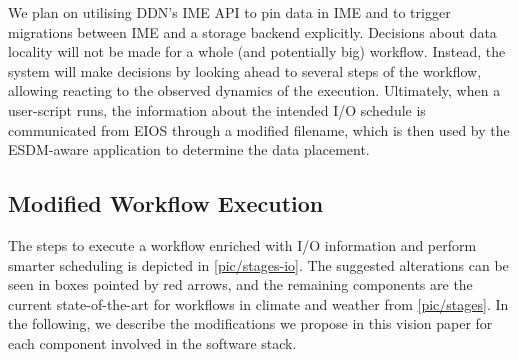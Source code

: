 \documentclass{superfri}
\begin{document}
We plan on utilising DDN's IME API to pin data in IME and to trigger migrations between IME and a storage backend explicitly.
Decisions about data locality will not be made for a whole (and potentially big) workflow.
Instead, the system will make decisions by looking ahead to several steps of the workflow, allowing reacting to the observed dynamics of the execution.
Ultimately, when a user-script runs, the information about the intended I/O schedule is communicated from EIOS through a modified filename, which is then used by the ESDM-aware application to determine the data placement.

\subsection{Modified Workflow Execution}

The steps to execute a workflow enriched with I/O information and perform smarter scheduling is depicted in \cref{pic/stages-io}.
The suggested alterations can be seen in boxes pointed by red arrows, and the remaining components are the current state-of-the-art for workflows in climate and weather from \cref{pic/stages}.
In the following, we describe the modifications we propose in this vision paper for each component involved in the software stack.

\end{document}
